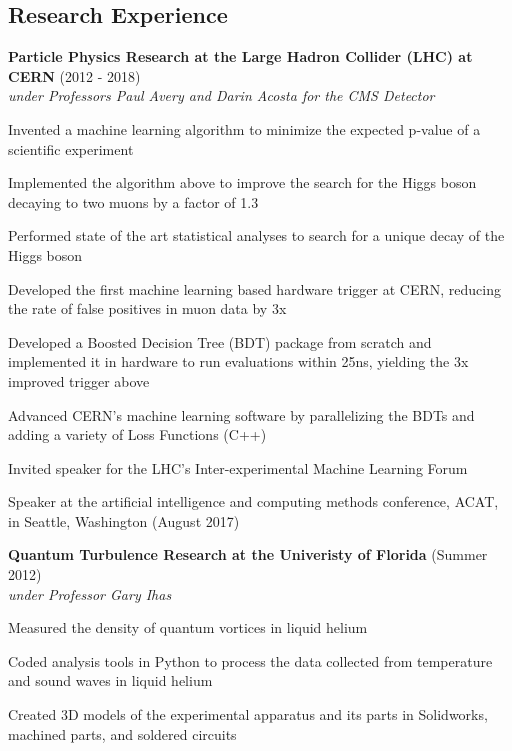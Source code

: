 \begin{resume}
    \section{\mysidestyle Research Experience}
    {\bf Particle Physics Research at the Large Hadron Collider (LHC) at CERN} (2012 - 2018)\\\vspace{2mm}%
    \textit{under Professors Paul Avery and Darin Acosta for the CMS Detector}
    \begin{stuff}
        \vspace*{1mm}
                \item Invented a machine learning algorithm to minimize the expected p-value of a scientific experiment
                \item Implemented the algorithm above to improve the search for the Higgs boson decaying to two muons by a factor of 1.3 
                \item Performed state of the art statistical analyses to search for a unique decay of the Higgs boson
                \item Developed the first machine learning based hardware trigger at CERN, reducing the rate of false positives in muon data by 3x
                \item Developed a Boosted Decision Tree (BDT) package from scratch and implemented it in hardware to run evaluations within 25ns, yielding the 3x improved trigger above
                \vspace*{15mm} 
                \item Advanced CERN's machine learning software by parallelizing the BDTs and adding a variety of Loss Functions (C++)
                \item Invited speaker for the LHC's Inter-experimental Machine Learning Forum
                \item Speaker at the artificial intelligence and computing methods conference, ACAT, in Seattle, Washington (August 2017)
                                           
    \end{stuff}

    {\bf Quantum Turbulence Research at the Univeristy of Florida} (Summer 2012)\\\vspace{2mm}%
    \textit{under Professor Gary Ihas}
    \begin{stuff}
        \vspace*{1mm}
                \item Measured the density of quantum vortices in liquid helium
                \item Coded analysis tools in Python to process the data collected from temperature and sound waves in liquid helium
		\item Created 3D models of the experimental apparatus and its parts in Solidworks, machined parts, and soldered circuits
    \end{stuff}


\end{resume}
